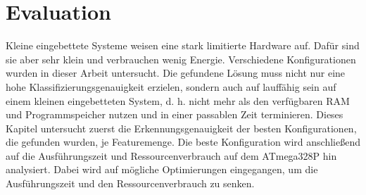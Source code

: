 \chapter{Evaluation}
Kleine eingebettete Systeme weisen eine stark limitierte Hardware auf. Dafür sind sie aber sehr klein und verbrauchen wenig Energie. Verschiedene Konfigurationen wurden in dieser Arbeit untersucht. Die gefundene
Lösung muss nicht nur eine hohe Klassifizierungsgenauigkeit erzielen, sondern auch auf lauffähig sein auf einem kleinen eingebetteten System, d. h. nicht mehr als den verfügbaren RAM und Programmspeicher nutzen und in
einer passablen Zeit terminieren.
\newline
\newline
Dieses Kapitel untersucht zuerst die Erkennungsgenauigkeit der besten Konfigurationen, die gefunden wurden, je Featuremenge. Die beste Konfiguration wird anschließend auf die Ausführungszeit
und Ressourcenverbrauch auf dem ATmega328P hin analysiert. Dabei wird auf mögliche Optimierungen eingegangen, um die Ausführungszeit und den Ressourcenverbrauch zu senken.



